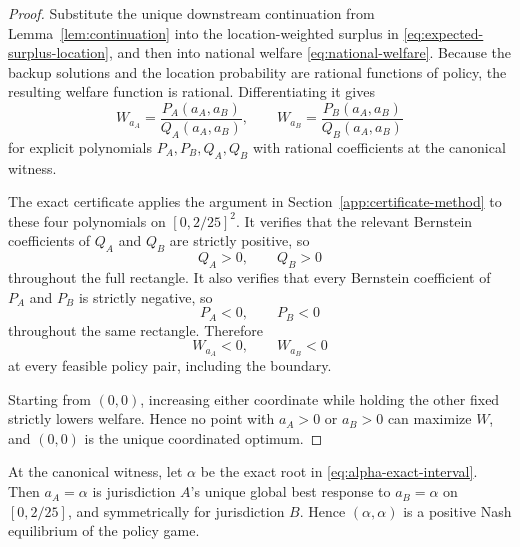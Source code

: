 \begin{proof}
Substitute the unique downstream continuation from Lemma~\ref{lem:continuation} into the location-weighted surplus in \eqref{eq:expected-surplus-location}, and then into national welfare \eqref{eq:national-welfare}. Because the backup solutions and the location probability are rational functions of policy, the resulting welfare function is rational. Differentiating it gives
\[
W_{a_A}=\frac{P_A(a_A,a_B)}{Q_A(a_A,a_B)},
\qquad
W_{a_B}=\frac{P_B(a_A,a_B)}{Q_B(a_A,a_B)}
\]
for explicit polynomials $P_A,P_B,Q_A,Q_B$ with rational coefficients at the canonical witness.

The exact certificate applies the argument in Section~\ref{app:certificate-method} to these four polynomials on $[0,2/25]^2$. It verifies that the relevant Bernstein coefficients of $Q_A$ and $Q_B$ are strictly positive, so
\[
Q_A>0,\qquad Q_B>0
\]
throughout the full rectangle. It also verifies that every Bernstein coefficient of $P_A$ and $P_B$ is strictly negative, so
\[
P_A<0,\qquad P_B<0
\]
throughout the same rectangle. Therefore
\[
W_{a_A}<0,\qquad W_{a_B}<0
\]
at every feasible policy pair, including the boundary.

Starting from $(0,0)$, increasing either coordinate while holding the other fixed strictly lowers welfare. Hence no point with $a_A>0$ or $a_B>0$ can maximize $W$, and $(0,0)$ is the unique coordinated optimum.
\end{proof}

\begin{lemma}\label{lem:local-global}
At the canonical witness, let $\alpha$ be the exact root in \eqref{eq:alpha-exact-interval}. Then $a_A=\alpha$ is jurisdiction $A$'s unique global best response to $a_B=\alpha$ on $[0,2/25]$, and symmetrically for jurisdiction $B$. Hence $(\alpha,\alpha)$ is a positive Nash equilibrium of the policy game.
\end{lemma}

